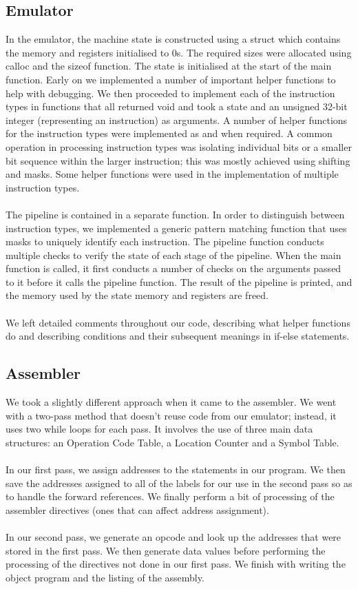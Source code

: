 \documentclass[11pt]{article}
\begin{document}
\subsection{Emulator}
In the emulator, the machine state is constructed using a struct which contains the memory and registers initialised to 0s. The required sizes were allocated using calloc and the sizeof function. The state is initialised at the start of the main function. Early on we implemented a number of important helper functions to help with debugging. We then proceeded to implement each of the instruction types in functions that all returned void and took a state and an unsigned 32-bit integer (representing an instruction) as arguments. A number of helper functions for the instruction types were implemented as and when required. A common operation in processing instruction types was isolating individual bits or a smaller bit sequence within the larger instruction; this was mostly achieved using shifting and masks. Some helper functions were used in the implementation of multiple instruction types.
\\ \\
The pipeline is contained in a separate function. In order to distinguish between instruction types, we implemented a generic pattern matching function that uses masks to uniquely identify each instruction. The pipeline function conducts multiple checks to verify the state of each stage of the pipeline. When the main function is called, it first conducts a number of checks on the arguments passed to it before it calls the pipeline function. The result of the pipeline is printed, and the memory used by the state memory and registers are freed.
\\ \\
We left detailed comments throughout our code, describing what helper functions do and describing conditions and their subsequent meanings in if-else statements.

\subsection{Assembler}
We took a slightly different approach when it came to the assembler. We went with a two-pass method that doesn't reuse code from our emulator; instead, it uses two while loops for each pass. It involves the use of three main data structures: an Operation Code Table, a Location Counter and a Symbol Table.
\\ \\
In our first pass, we assign addresses to the statements in our program. We then save the addresses assigned to all of the labels for our use in the second pass so as to handle the forward references. We finally perform a bit of processing of the assembler directives (ones that can affect address assignment).
\\ \\
In our second pass, we generate an opcode and look up the addresses that were stored in the first pass. We then generate data values before performing the processing of the directives not done in our first pass. We finish with writing the object program and the listing of the assembly.
\end{document}
